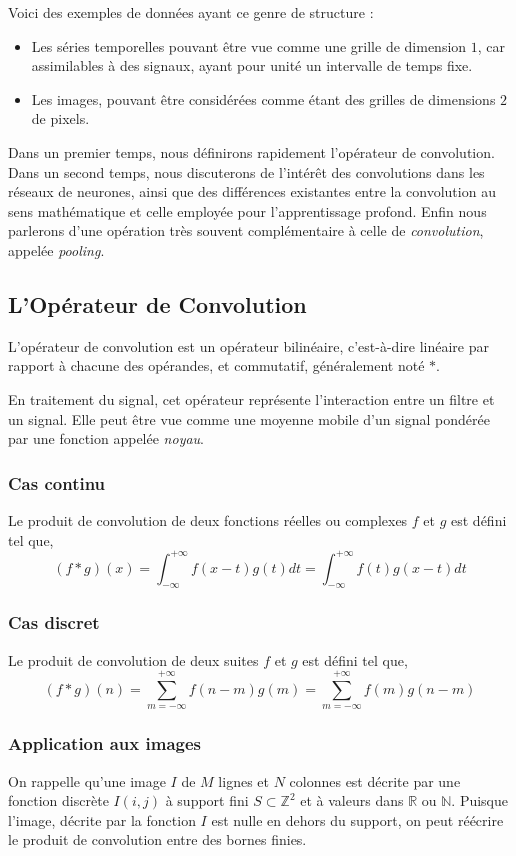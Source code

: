 \documentclass[a4paper, 10pt]{report}
\begin{document}
Voici des exemples de données ayant ce genre de structure :
\begin{itemize}
	\item Les séries temporelles pouvant être vue comme une grille de dimension $1$, car assimilables à des signaux, ayant pour unité un intervalle de temps fixe.
	\item Les images, pouvant être considérées comme étant des grilles de dimensions $2$ de pixels.
\end{itemize}
Dans un premier temps, nous définirons rapidement l'opérateur de convolution.
Dans un second temps, nous discuterons de l'intérêt des convolutions dans les réseaux de neurones, ainsi que des différences existantes entre la convolution au sens mathématique et celle employée pour l'apprentissage profond.
Enfin nous parlerons d'une opération très souvent complémentaire à celle de \emph{convolution}, appelée \emph{pooling}.
\subsection{L'Opérateur de Convolution}
L'opérateur de convolution est un opérateur bilinéaire, c'est-à-dire linéaire par rapport à chacune des opérandes, et commutatif, généralement noté $*$.

En traitement du signal, cet opérateur représente l’interaction entre un filtre et un signal.
Elle peut être vue comme une moyenne mobile d'un signal pondérée par une fonction appelée \emph{noyau}.
\subsubsection{Cas continu}
Le produit de convolution de deux fonctions réelles ou complexes $f$ et $g$ est défini tel que,
$$(f * g)(x) = \int_{-\infty}^{+\infty}{f(x-t)g(t)dt} = \int_{-\infty}^{+\infty}{f(t)g(x-t)dt}$$
\subsubsection{Cas discret}
Le produit de convolution de deux suites $f$ et $g$ est défini tel que,
$$(f *g)(n) = \sum_{m = -\infty}^{+\infty}{f(n-m)g(m)} = \sum_{m = -\infty}^{+\infty}{f(m)g(n-m)}$$
\subsubsection{Application aux images}
On rappelle qu'une image $I$ de $M$ lignes et $N$ colonnes est décrite par une fonction discrète $I(i,j)$ à support fini $S \subset \mathbb{Z}^2$ et à valeurs dans $\mathbb{R}$ ou $\mathbb{N}$.
Puisque l'image, décrite par la fonction $I$ est nulle en dehors du support, on peut réécrire le produit de convolution entre des bornes finies.
\end{document}
